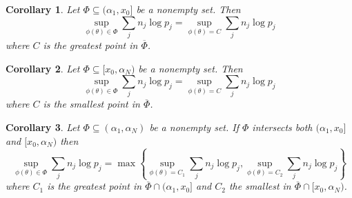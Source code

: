 \documentclass{article}
\theoremstyle{plain}
\newtheorem{corollary}   {\bf Corollary}   [section]
\theoremstyle{definition}
\begin{document}
\begin{corollary}
	Let $\Phi\subseteq(\alpha_1,x_0]$ be a nonempty set. Then
	$$\sup_{\phi(\theta)\in\Phi}\sum_jn_j\log p_j=\sup_{\phi(\theta)=C}\sum_jn_j\log p_j$$
	where $C$ is the greatest point in $\overline{\Phi}$.
\end{corollary}

\begin{corollary}
	Let $\Phi\subseteq[x_0,\alpha_N)$ be a nonempty set. Then
	$$\sup_{\phi(\theta)\in\Phi}\sum_jn_j\log p_j=\sup_{\phi(\theta)=C}\sum_jn_j\log p_j$$
	where $C$ is the smallest point in $\overline{\Phi}$.
\end{corollary}

\begin{corollary}\label{twocases}
	Let $\Phi\subseteq(\alpha_1,\alpha_N)$ be a nonempty set. If $\Phi$ intersects both
	$(\alpha_1,x_0]$ and $[x_0,\alpha_N)$ then 
	$$\sup_{\phi(\theta)\in\Phi}\sum_jn_j\log p_j=\max\left\{\sup_{\phi(\theta)=C_1}
	\sum_jn_j\log p_j,\sup_{\phi(\theta)=C_2}\sum_jn_j\log p_j\right\}$$
	where $C_1$ is the greatest point in $\overline{\Phi}\cap(\alpha_1,x_0]$ and $C_2$ the
	smallest in $\overline{\Phi}\cap[x_0,\alpha_N)$.
\end{corollary}



\end{document}
